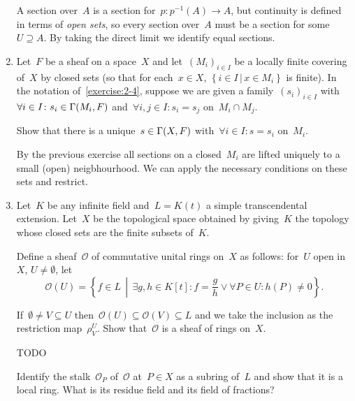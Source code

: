 \documentclass[a4paper,11pt,oneside,openany,article]{memoir}
\begin{document}
\begin{enumerate}
    \begin{solution}
      A section over~$A$ is a section for~$p\colon p^{-1}(A)\to A$, but continuity is defined in terms of \emph{open sets}, so every section over~$A$ must be a section for some~$U\supseteq A$. By taking the direct limit we identify equal sections.
    \end{solution}

  \item\label{exercise:2-5} Let~$F$ be a sheaf on a space~$X$ and let~$(M_i)_{i\in I}$ be a locally finite covering of~$X$ by closed sets (so that for each~$x\in X$, $\left\{ i\in I\,|\,x\in M_i \right\}$ is finite). In the notation of~\ref{exercise:2-4}, suppose we are given a family~$(s_i)_{i\in I}$ with~$\forall i\in I\colon s_i\in\mathrm{\Gamma}(M_i,F)$ and~$\forall i,j\in I\colon s_i=s_j$ on~$M_i\cap M_j$.

    Show that there is a unique~$s\in\mathrm{\Gamma}(X,F)$ with~$\forall i\in I\colon s=s_i$ on~$M_i$.

    \begin{solution}
      By the previous exercise all sections on a closed~$M_i$ are lifted uniquely to a small (open) neigbhourhood. We can apply the necessary conditions on these sets and restrict.
    \end{solution}

  \item Let~$K$ be any infinite field and~$L=K(t)$ a simple transcendental extension. Let~$X$ be the topological space obtained by giving~$K$ the topology whose closed sets are the finite subsets of~$K$.

    Define a sheaf~$\mathcal{O}$ of commutative unital rings on~$X$ as follows: for~$U$ open in~$X$, $U\neq\emptyset$, let
    \begin{equation}
      \mathcal{O}(U)=\left\{ f\in L\,\middle|\,\exists g,h\in K[t]\colon f=\frac{g}{h}\vee\forall P\in U\colon h(P)\neq 0 \right\}.
      \label{equation:rational-functions}
    \end{equation}

    If~$\emptyset\neq V\subseteq U$ then~$\mathcal{O}(U)\subseteq\mathcal{O}(V)\subseteq L$ and we take the inclusion as the restriction map~$\rho_V^U$. Show that~$\mathcal{O}$ is a sheaf of rings on~$X$.

    \begin{solution}
      TODO
    \end{solution}

    Identify the stalk~$\mathcal{O}_P$ of~$\mathcal{O}$ at~$P\in X$ as a subring of~$L$ and show that it is a local ring. What is its residue field and its field of fractions?


\end{enumerate}
\end{document}

